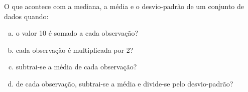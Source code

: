 %
%


\begin{exercicioBanco}[\valorquestao]
O que acontece com a mediana, a média e o desvio-padrão de um conjunto de dados quando:
%
\begin{enumerate}[(a)]
    \item o valor 10 é somado a cada observação?
    \item cada observação é multiplicada por 2?
    \item subtrai-se a média de cada observação?
    \item de cada observação, subtrai-se a média e divide-se pelo desvio-padrão?
\end{enumerate}
%
\end{exercicioBanco}

